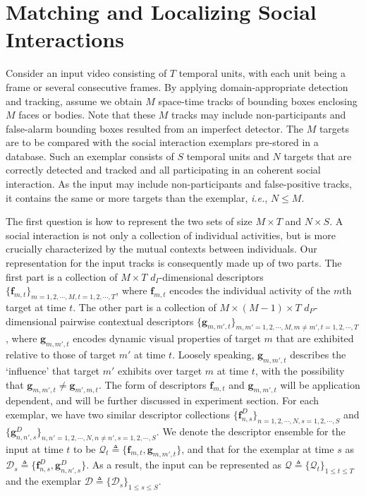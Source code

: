\section{Matching and Localizing Social Interactions}


Consider an input video consisting of $T$ temporal units, with each unit being a frame or several consecutive frames. By applying domain-appropriate detection and tracking, assume we obtain $M$ space-time tracks of bounding boxes enclosing $M$ faces or bodies. Note that these $M$ tracks may include non-participants and false-alarm bounding boxes resulted from an imperfect detector. The $M$ targets are to be compared with the social interaction exemplars pre-stored in a database. Such an exemplar consists of $S$ temporal units and $N$ targets that are correctly detected and tracked and all participating in an coherent social interaction. As the input may include non-participants and false-positive tracks, it contains the same or more targets than the exemplar, \textit{i.e.}, $N\leq M$.

The first question is how to represent the two sets of size $M\times T$ and $N\times S$. A social interaction is not only a collection of individual activities, but is more crucially characterized by the mutual contexts between individuals. Our representation for the input tracks is consequently made up of two parts. The first part is a collection of $M\times T$ $d_{I}$-dimensional descriptors $\{\mathbf{f}_{m,t}\}_{m=1,2,\cdots,M, t=1,2,\cdots,T}$, where $\mathbf{f}_{m,t}$ encodes the individual activity of the $m$th target at time $t$. The other part is a collection of $M\times (M-1)\times T$ $d_{P}$-dimensional pairwise contextual descriptors $\{\mathbf{g}_{m,m',t}\}_{m,m'=1,2,\cdots,M, m\neq m', t=1,2,\cdots,T}$, where $\mathbf{g}_{m,m',t}$ encodes dynamic visual properties of target $m$ that are exhibited relative to those of target $m'$ at time $t$. Loosely speaking, $\mathbf{g}_{m,m',t}$ describes the `influence' that target $m'$ exhibits over target $m$ at time $t$, with the possibility that $\mathbf{g}_{m,m',t}\ne\mathbf{g}_{m',m,t}$. The form of descriptors $\mathbf{f}_{m,t}$ and $\mathbf{g}_{m,m',t}$ will be application dependent, and will be further discussed in experiment section. For each exemplar, we have two similar descriptor collections $\{\mathbf{f}^{D}_{n,s}\}_{n=1,2,\cdots,N, s=1, 2,\cdots, S}$ and $\{\mathbf{g}^{D}_{n,n',s}\}_{n,n'=1,2,\cdots,N, n\neq n', s=1, 2,\cdots, S}$. We denote the descriptor ensemble for the input at time $t$ to be $\mathcal{Q}_{t}\triangleq\{\mathbf{f}_{m,t},\mathbf{g}_{m,m',t}\}$, and that for the exemplar at time $s$ as $\mathcal{D}_{s}\triangleq\{\mathbf{f}^{D}_{n,s},\mathbf{g}^{D}_{n,n',s}\} $. As a result, the input can be represented as $\mathcal{Q}\triangleq\{\mathcal{Q}_{t}\}_{1\leq t\leq T}$ and the exemplar $\mathcal{D}\triangleq\{\mathcal{D}_{s}\}_{1\leq s\leq S}$.


